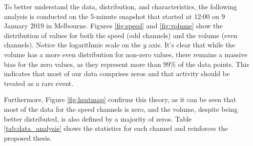 To better understand the data, distribution, and characteristics, the following analysis is conducted on the 5-minute snapshot that started at 12:00 on 9 January 2019 in Melbourne. Figures \ref{fig:speed} and \ref{fig:volume} show the distribution of values for both the speed (odd channels) and the volume (even channels). Notice the logarithmic scale on the $y$ axis. It's clear that while the volume has a more even distribution for non-zero values, there remains a massive bias for the zero values, as they represent more than 99\% of the data points. This indicates that most of our data comprises zeros and that activity should be treated as a rare event.

Furthermore, Figure \ref{fig:heatmap} confirms this theory, as it can be seen that most of the data for the speed channels is zero, and the volume, despite being better distributed, is also defined by a majority of zeros. Table \ref{tab:data_analysis} shows the statistics for each channel and reinforces the proposed thesis.



